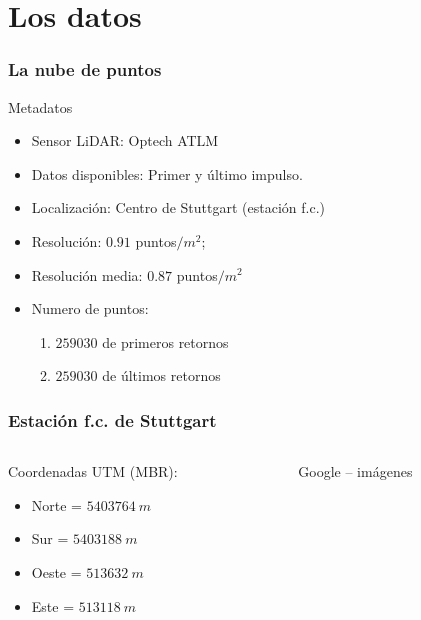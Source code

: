 \section{Los datos}
\begin{frame}
\frametitle{La nube de puntos}
Metadatos
\begin{itemize}
 \item Sensor LiDAR: \alert{Optech ATLM}
 \item Datos disponibles: Primer y último impulso.
 \item Localización: Centro de Stuttgart (estación f.c.)
 \item Resolución: $0.91$ puntos$/m^2$; 
 \item Resolución media: $0.87$ puntos$/m^2$
 \item Numero de puntos: 
  \begin{enumerate}
    \item $259030$ de primeros retornos
    \item $259030$ de últimos retornos
   \end{enumerate}
\end{itemize}
\end{frame}
\begin{frame}
\frametitle{Estación f.c. de Stuttgart}
 \begin{columns}
  \begin{column}{0.45\textwidth}
	Coordenadas UTM (MBR):
	\begin{itemize}
	 \item Norte = $5403764~m$
	 \item Sur = $5403188~m$
	 \item Oeste = $513632~m$
	 \item Este = $513118~m$
	\end{itemize}
   \end{column}
  \begin{column}{0.55\textwidth}
    \begin{center}
	\tiny{ Google -- imágenes}
    \end{center}
   \end{column}
 \end{columns}
\end{frame}
